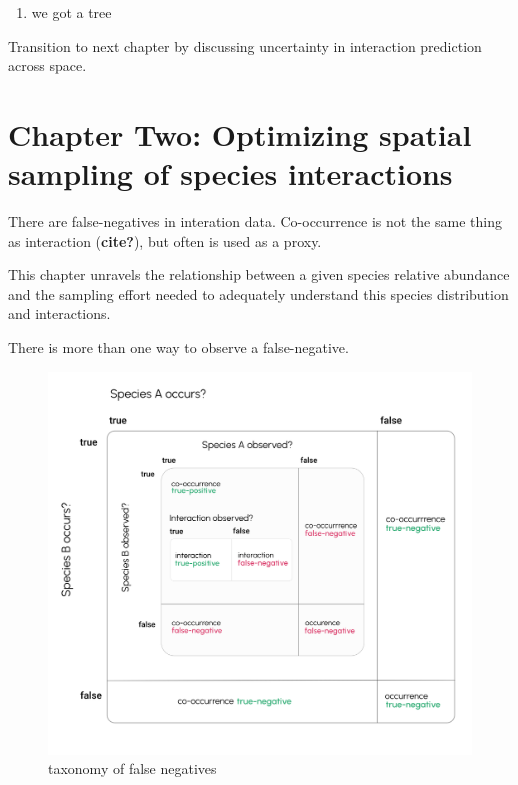 \documentclass[11pt]{article}
\makeatletter
\def\maxwidth{\ifdim\Gin@nat@width>\linewidth\linewidth
\else\Gin@nat@width\fi}
\let\Oldincludegraphics\includegraphics
\renewcommand{\includegraphics}[1]{\Oldincludegraphics[width=\maxwidth]{#1}}
\makeatother
\begin{document}
\begin{enumerate}
\def\labelenumi{\arabic{enumi})}
\tightlist
\item
  we got a tree
\end{enumerate}

Transition to next chapter by discussing uncertainty in interaction
prediction across space.

\hypertarget{chapter-two-optimizing-spatial-sampling-of-species-interactions}{%
\section{Chapter Two: Optimizing spatial sampling of species
interactions}\label{chapter-two-optimizing-spatial-sampling-of-species-interactions}}

There are false-negatives in interation data. Co-occurrence is not the
same thing as interaction (\textbf{cite?}), but often is used as a
proxy.

This chapter unravels the relationship between a given species relative
abundance and the sampling effort needed to adequately understand this
species distribution and interactions.

There is more than one way to observe a false-negative.

\begin{figure}
\centering
\includegraphics{./figures/ch2.png}
\caption{taxonomy of false negatives}
\end{figure}
\end{document}
